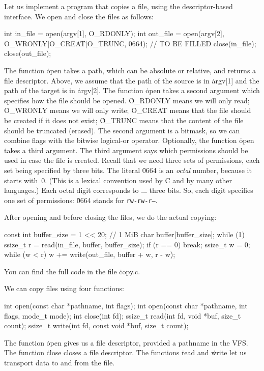 Let us implement a program that copies a file,
  using the descriptor-based interface.
We open and close the files as follows:
\begin{ccode}
  int in_file = open(argv[1], O_RDONLY);
  int out_file = open(argv[2], O_WRONLY|O_CREAT|O_TRUNC, 0664);
  // TO BE FILLED
  close(in_file);
  close(out_file);
\end{ccode}
The function \.{open} takes a path, which can be absolute or relative,
  and returns a file descriptor.
Above, we assume that the path of the source is in \.{argv[1]}
  and the path of the target is in \.{argv[2]}.
The function \.{open} takes a second argument
  which specifies how the file should be opened.
\.{O\_RDONLY} means we will only read;
  \.{O\_WRONLY} means we will only write;
  \.{O\_CREAT} means that the file should be created if it does not exist;
  \.{O\_TRUNC} means that the content of the file should be truncated (erased).
The second argument is a bitmask,
  so we can combine flags with the bitwise logical-or operator.
Optionally, the function \.{open} takes a third argument.
The third argument says which permissions should be used in case
  the file is created.
Recall that we need three sets of permissions,
  each set being specified by three bits.
The literal \.{0664} is an \emph{octal} number, because it starts with~\.{0}.
(This is a lexical convention used by C and by many other languages.)
Each octal digit corresponds to $\ldots$ three bits.
So, each digit specifies one set of permissions:
  \.{0664} stands for {\tt rw-rw-r--}.

After opening and before closing the files,
  we do the actual copying:
\begin{ccode}
  const int buffer_size = 1 << 20; // 1 MiB
  char buffer[buffer_size];
  while (1) {
    ssize_t r = read(in_file, buffer, buffer_size);
    if (r == 0) break;
    ssize_t w = 0;
    while (w < r) w += write(out_file, buffer + w, r - w);
  }
\end{ccode}
You can find the full code in the file \.{copy.c}.

We can copy files using four functions:
\begin{ccode}
int open(const char *pathname, int flags);
int open(const char *pathname, int flags, mode_t mode);
int close(int fd);
ssize_t read(int fd, void *buf, size_t count);
ssize_t write(int fd, const void *buf, size_t count);
\end{ccode}
The function \.{open} gives us a file descriptor,
  provided a pathname in the VFS\null.
The function \.{close} closes a file descriptor.
The functions \.{read} and \.{write} let us transport data to and from the file.


